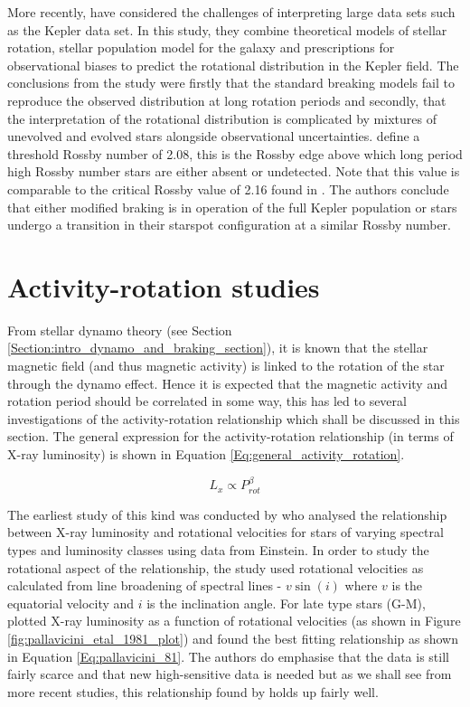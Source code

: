 More recently, \citet{van_Saders_etal_2018} have considered the challenges of interpreting large data sets such as the Kepler data set. In this study, they combine theoretical models of stellar rotation, stellar population model for the galaxy and prescriptions for observational biases to predict the rotational distribution in the Kepler field. The conclusions from the study were firstly that the standard breaking models fail to reproduce the observed distribution at long rotation periods and secondly, that the interpretation of the rotational distribution is complicated by mixtures of unevolved and evolved stars alongside observational uncertainties. \citet{van_Saders_etal_2018} define a threshold Rossby number of 2.08, this is the Rossby edge above which long period high Rossby number stars are either absent or undetected. Note that this value is comparable to the critical Rossby value of 2.16 found in \citet{van_Saders_etal_2016}. The authors conclude that either modified braking is in operation of the full Kepler population or stars undergo a transition in their starspot configuration at a similar Rossby number.

\section{Activity-rotation studies}
\label{Chp2_activity-rotation_lit_review}

From stellar dynamo theory (see Section \ref{Section:intro_dynamo_and_braking_section}), it is known that the stellar magnetic field (and thus magnetic activity) is linked to the rotation of the star through the dynamo effect. Hence it is expected that the magnetic activity and rotation period should be correlated in some way, this has led to several investigations of the activity-rotation relationship which shall be discussed in this section. The general expression for the activity-rotation relationship (in terms of X-ray luminosity) is shown in Equation \ref{Eq:general_activity_rotation}.

\begin{equation}
    L_{x} \propto P_{rot}^{\beta}
    \label{Eq:general_activity_rotation}
\end{equation}

The earliest study of this kind was conducted by \citet{Pallavicini_etal_1981} who analysed the relationship between X-ray luminosity and rotational velocities for stars of varying spectral types and luminosity classes using data from Einstein. In order to study the rotational aspect of the relationship, the study used rotational velocities as calculated from line broadening of spectral lines - $v\sin(i)$ where $v$ is the equatorial velocity and $i$ is the inclination angle. For late type stars (G-M), \citet{Pallavicini_etal_1981} plotted X-ray luminosity as a function of rotational velocities (as shown in Figure \ref{fig:pallavicini_etal_1981_plot}) and found the best fitting relationship as shown in Equation \ref{Eq:pallavicini_81}. The authors do emphasise that the data is still fairly scarce and that new high-sensitive data is needed but as we shall see from more recent studies, this relationship found by \citet{Pallavicini_etal_1981} holds up fairly well.

